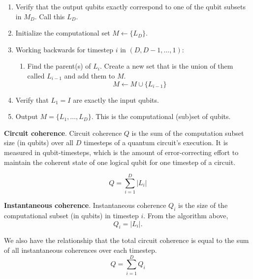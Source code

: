 \begin{enumerate}
\begin{enumerate}
\item
Verify that the output qubits exactly correspond to one of the qubit subsets
in $M_D$. Call this $L_D$.
\item
Initialize the computational set $M \leftarrow \{ L_D \}$.
\item
Working backwards for timestep $i$ in $(D, D-1, \ldots, 1)$:
\begin{enumerate}
\item
Find the parent(s) of $L_i$. Create a new set that is the union of them called $L_{i-1}$
and add them to $M$.
\begin{equation}
M \leftarrow M \cup \{L_{i-1}\}
\end{equation}
\end{enumerate}

\item Verify that $L_1 = I$ are exactly the input qubits.

\item Output $M = \{L_1, \ldots, L_D\}$. This is the computational (sub)set of qubits.
\end{enumerate}

\end{enumerate}


\begin{definition}{\textbf{Circuit coherence}.}
Circuit coherence $Q$ is the sum of the computation subset size (in qubits)
over all $D$ timesteps of a quantum circuit's execution. It is measured
in qubit-timesteps, which is the amount of error-correcting effort to
maintain the coherent state of one logical qubit for one timestep of a circuit.

\begin{equation}
Q = \sum_{i=1}^D |L_i|
\end{equation}
\end{definition}


\begin{definition}{\textbf{Instantaneous coherence}.}
Instantaneous coherence $Q_i$ is the size of the computational subset
(in qubits) in timestep $i$. From the algorithm above,
\begin{equation}
Q_i = |L_i|\text{.}
\end{equation}

We also have the relationship that the total circuit coherence is equal
to the sum of all instantaneous coherences over each timestep.
\begin{equation}
Q = \sum_{i=1}^D Q_i
\end{equation}
\end{definition}

